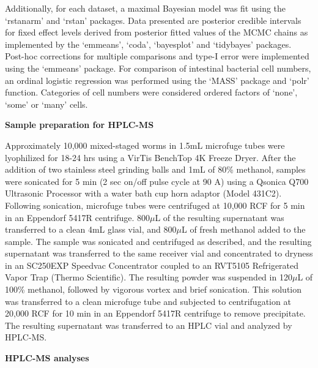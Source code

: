 \documentclass[11pt,]{article}
\begin{document}
Additionally, for each dataset, a maximal Bayesian model was fit using
the `rstanarm' and `rstan' packages. Data presented are posterior
credible intervals for fixed effect levels derived from posterior fitted
values of the MCMC chains as implemented by the `emmeans', `coda',
`bayesplot' and `tidybayes' packages. Post-hoc corrections for multiple
comparisons and type-I error were implemented using the `emmeans'
package. For comparison of intestinal bacterial cell numbers, an ordinal
logistic regression was performed using the `MASS' package and `polr'
function. Categories of cell numbers were considered ordered factors of
`none', `some' or `many' cells.

\vspace{2\parsep}

\noindent \textbf{Sample preparation for HPLC-MS}

Approximately 10,000 mixed-staged worms in 1.5mL microfuge tubes were
lyophilized for 18-24 hrs using a VirTis BenchTop 4K Freeze Dryer. After
the addition of two stainless steel grinding balls and 1mL of 80\%
methanol, samples were sonicated for 5 min (2 sec on/off pulse cycle at
90 A) using a Qsonica Q700 Ultrasonic Processor with a water bath cup
horn adaptor (Model 431C2). Following sonication, microfuge tubes were
centrifuged at 10,000 RCF for 5 min in an Eppendorf 5417R centrifuge.
800\(\mu\)L of the resulting supernatant was transferred to a clean 4mL
glass vial, and 800\(\mu\)L of fresh methanol added to the sample. The
sample was sonicated and centrifuged as described, and the resulting
supernatant was transferred to the same receiver vial and concentrated
to dryness in an SC250EXP Speedvac Concentrator coupled to an RVT5105
Refrigerated Vapor Trap (Thermo Scientific). The resulting powder was
suspended in 120\(\mu\)L of 100\% methanol, followed by vigorous vortex
and brief sonication. This solution was transferred to a clean microfuge
tube and subjected to centrifugation at 20,000 RCF for 10 min in an
Eppendorf 5417R centrifuge to remove precipitate. The resulting
supernatant was transferred to an HPLC vial and analyzed by HPLC-MS.

\vspace{2\parsep}

\noindent \textbf{HPLC-MS analyses}
\end{document}
